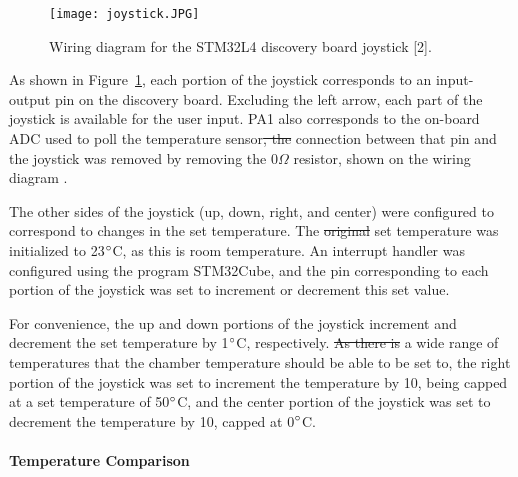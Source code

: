 \documentclass[11pt,letter]{article}
\providecommand{\DIFadd}[1]{{\protect\color{blue}\uwave{#1}}} %
\providecommand{\DIFdel}[1]{{\protect\color{red}\sout{#1}}}                      %
\providecommand{\DIFaddbegin}{} %
\providecommand{\DIFaddend}{} %
\providecommand{\DIFdelbegin}{} %
\providecommand{\DIFdelend}{} %
\providecommand{\DIFaddbeginFL}{} %
\providecommand{\DIFaddendFL}{} %
\providecommand{\DIFdelbeginFL}{} %
\providecommand{\DIFdelendFL}{} %
\newcommand{\DIFscaledelfig}{0.5}
\newlength{\DIFdelgraphicswidth} %
\newlength{\DIFdelgraphicsheight} %
\newcommand{\DIFaddincludegraphics}[2][]{{\color{blue}\fbox{\DIFOincludegraphics[#1]{#2}}}} %
\newcommand{\DIFdelincludegraphics}[2][]{%
\sbox{\DIFdelgraphicsbox}{\DIFOincludegraphics[#1]{#2}}%
\settoboxwidth{\DIFdelgraphicswidth}{\DIFdelgraphicsbox} %
\settoboxtotalheight{\DIFdelgraphicsheight}{\DIFdelgraphicsbox} %
\scalebox{\DIFscaledelfig}{%
\parbox[b]{\DIFdelgraphicswidth}{\usebox{\DIFdelgraphicsbox}\\[-\baselineskip] \rule{\DIFdelgraphicswidth}{0em}}\llap{\resizebox{\DIFdelgraphicswidth}{\DIFdelgraphicsheight}{%
\setlength{\unitlength}{\DIFdelgraphicswidth}%
\begin{picture}(1,1)%
\thicklines\linethickness{2pt} %
{\color[rgb]{1,0,0}\put(0,0){\framebox(1,1){}}}%
{\color[rgb]{1,0,0}\put(0,0){\line( 1,1){1}}}%
{\color[rgb]{1,0,0}\put(0,1){\line(1,-1){1}}}%
\end{picture}%
}\hspace*{3pt}}} %
} %
\DeclareRobustCommand{\DIFaddbegin}{\DIFOaddbegin \let\includegraphics\DIFaddincludegraphics} %
\DeclareRobustCommand{\DIFaddend}{\DIFOaddend \let\includegraphics\DIFOincludegraphics} %
\DeclareRobustCommand{\DIFdelbegin}{\DIFOdelbegin \let\includegraphics\DIFdelincludegraphics} %
\DeclareRobustCommand{\DIFdelend}{\DIFOaddend \let\includegraphics\DIFOincludegraphics} %
\DeclareRobustCommand{\DIFaddbeginFL}{\DIFOaddbeginFL \let\includegraphics\DIFaddincludegraphics} %
\DeclareRobustCommand{\DIFaddendFL}{\DIFOaddendFL \let\includegraphics\DIFOincludegraphics} %
\DeclareRobustCommand{\DIFdelbeginFL}{\DIFOdelbeginFL \let\includegraphics\DIFdelincludegraphics} %
\DeclareRobustCommand{\DIFdelendFL}{\DIFOaddendFL \let\includegraphics\DIFOincludegraphics} %
\begin{document}
\begin{figure}[H]
    \centering
    \DIFdelbeginFL %
\DIFdelendFL \DIFaddbeginFL \texttt{[image: joystick.JPG]}
    \DIFaddendFL \caption{Wiring diagram for the STM32L4 discovery board joystick [2].}
    \label{fig:joystick}
\end{figure}

As shown in Figure~\ref{fig:joystick}, each portion of the joystick corresponds to an input-output pin on the discovery board. Excluding the left arrow, each part of the joystick is available for the user input. PA1 also corresponds to the on-board ADC used to poll the temperature sensor\DIFdelbegin \DIFdel{, the }\DIFdelend \DIFaddbegin \DIFadd{. The }\DIFaddend connection between that pin and the joystick was removed by removing the 0$\Omega$ resistor, shown on the wiring diagram \DIFaddbegin \DIFadd{in Figure \ref{fig:joystick}}\DIFaddend . 

The other sides of the joystick (up, down, right, and center) were configured to correspond to changes in the set temperature. The \DIFdelbegin \DIFdel{original }\DIFdelend set temperature was initialized to 23$\degree$C, as this is room temperature. An interrupt handler was configured using the program STM32Cube, and the pin corresponding to each portion of the joystick was set to increment or decrement this set value. 

For convenience, the up and down portions of the joystick increment and decrement the set temperature by 1$\degree$C, respectively. \DIFdelbegin \DIFdel{As there is }\DIFdelend \DIFaddbegin \DIFadd{With }\DIFaddend a wide range of temperatures that the chamber temperature should be able to be set to, the right portion of the joystick was set to increment the temperature by 10, being capped at a set temperature of 50$\degree$C, and the center portion of the joystick was set to decrement the temperature by 10, capped at 0$\degree$C.

\paragraph{Temperature Comparison} \
\end{document}
